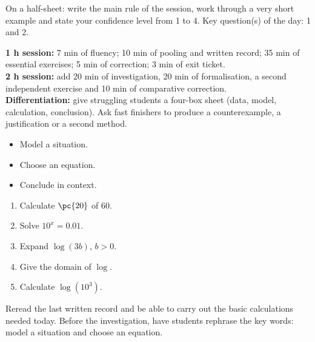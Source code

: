 \begin{exitticket}[3 minutes]On a half-sheet: write the main rule of the session, work through a very short example and state your confidence level from 1 to 4. Key question(s) of the day: 1 and 2.\end{exitticket}

\ifmxteacher
\begin{method}
\textbf{1 h session:} 7 min of fluency; 10 min of pooling and written record; 35 min of essential exercises; 5 min of correction; 3 min of exit ticket.\\
\textbf{2 h session:} add 20 min of investigation, 20 min of formalisation, a second independent exercise and 10 min of comparative correction.\\
\textbf{Differentiation:} give struggling students a four-box sheet (data, model, calculation, conclusion). Ask fast finishers to produce a counterexample, a justification or a second method.
\end{method}
\fi
{}
\begin{objectives}\begin{itemize}\item Model a situation.\item Choose an equation.\item Conclude in context.\end{itemize}\end{objectives}
\begin{fluency}\begin{enumerate}\item Calculate $\pc{20}$ of $60$. \item Solve $10^x=\num{0,01}$. \item Expand $\log(3b)$, $b>0$. \item Give the domain of $\log$. \mxblank{$]0,+\infty[$}\item Calculate $\log(10^3)$. \end{enumerate}\end{fluency}
\begin{prerequisites}Reread the last written record and be able to carry out the basic calculations needed today. Before the investigation, have students rephrase the key words: model a situation and choose an equation.\end{prerequisites}

